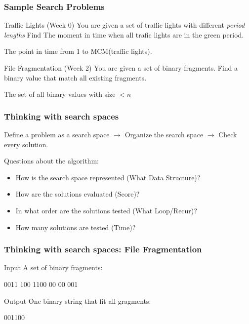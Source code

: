 \documentclass{beamer}
\begin{document}
\begin{frame}
  \frametitle{Sample Search Problems}
  \begin{block}{Traffic Lights (Week 0)}
    You are given a set of traffic lights with different \emph{period lengths}
    \alert{Find} The moment in time when all trafic lights are in the
    green period.

    \bigskip

     The point in time from 1 to MCM(traffic lights).
  \end{block}

  \begin{block}{File Fragmentation (Week 2)}
    You are given a set of binary fragments. \alert{Find} a binary
    value that match all existing fragments.

    \bigskip

     The set of all binary values with size $< n$
  \end{block}

\end{frame}


\begin{frame}
  \frametitle{Thinking with search spaces}

  Define a problem as a search space $\rightarrow$ Organize
  the search space $\rightarrow$ Check every solution.

  \bigskip

  Questions about the algorithm:
  \begin{itemize}
  \item How is the search space represented (What Data Structure)?
  \item How are the solutions evaluated (Score)?
  \item In what order are the solutions tested (What Loop/Recur)?
  \item How many solutions are tested (Time)?
  \end{itemize}
\end{frame}


\begin{frame}
  \frametitle{Thinking with search spaces: File Fragmentation}
  \begin{block}{Input}
    A set of binary fragments:
    \bigskip

    0011
    100
    1100
    00
    00
    001
  \end{block}

  \begin{exampleblock}{Output}
    One binary string that fit all gragments:
    \bigskip

    001100
  \end{exampleblock}
\end{frame}
\end{document}
